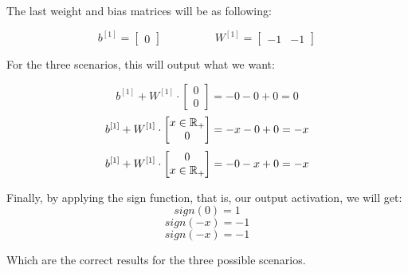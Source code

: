 \documentclass[12pt]{article}
\begin{document}
\begin{itemize}
        The last weight and bias matrices will be as following:

        \[
            b^{[1]} = \begin{bmatrix}
                0
            \end{bmatrix}
            \hspace{2cm}
            W^{[1]} = \begin{bmatrix}
                -1 & -1
            \end{bmatrix}
        \]

        For the three scenarios, this will output what we want:

        \[
            b^{[1]}+W^{[1]}\cdot
            \begin{bmatrix}
                0 \\
                0
            \end{bmatrix}
            =
            -0 -0 + 0 = 0
        \]
        \[
            b^{[1]}+W^{[1]}\cdot\begin{bmatrix}x\in\mathbb{R}_{+}\\0\end{bmatrix}
            =
            - x - 0 + 0 = -x
        \]
        \[
            b^{[1]}+W^{[1]}\cdot\begin{bmatrix}0\\x\in\mathbb{R}_{+}\end{bmatrix}
            =
            - 0 - x + 0 = -x
        \]

        Finally, by applying the sign function, that is, our output activation, we will get:
        \[
            sign(0) = 1
        \]
        \[
            sign(-x) = -1
        \]
        \[
            sign(-x) = -1
        \]

        Which are the correct results for the three possible scenarios.

    \end{itemize}
\end{document}
